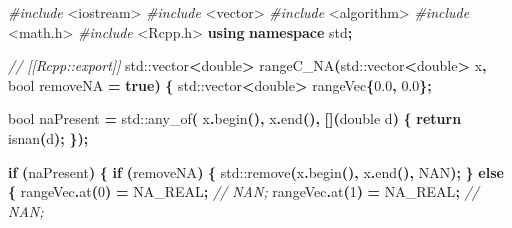 \documentclass[
]{book}
\newenvironment{Shaded}{\begin{snugshade}}{\end{snugshade}}
\newcommand{\BuiltInTok}[1]{#1}
\newcommand{\CommentTok}[1]{\textcolor[rgb]{0.56,0.35,0.01}{\textit{#1}}}
\newcommand{\ControlFlowTok}[1]{\textcolor[rgb]{0.13,0.29,0.53}{\textbf{#1}}}
\newcommand{\DataTypeTok}[1]{\textcolor[rgb]{0.13,0.29,0.53}{#1}}
\newcommand{\DecValTok}[1]{\textcolor[rgb]{0.00,0.00,0.81}{#1}}
\newcommand{\FloatTok}[1]{\textcolor[rgb]{0.00,0.00,0.81}{#1}}
\newcommand{\ImportTok}[1]{#1}
\newcommand{\KeywordTok}[1]{\textcolor[rgb]{0.13,0.29,0.53}{\textbf{#1}}}
\newcommand{\NormalTok}[1]{#1}
\newcommand{\OperatorTok}[1]{\textcolor[rgb]{0.81,0.36,0.00}{\textbf{#1}}}
\newcommand{\PreprocessorTok}[1]{\textcolor[rgb]{0.56,0.35,0.01}{\textit{#1}}}
\begin{document}
\begin{Shaded}
\begin{Highlighting}[]
\PreprocessorTok{\#include }\ImportTok{\textless{}iostream\textgreater{}}
\PreprocessorTok{\#include }\ImportTok{\textless{}vector\textgreater{}}
\PreprocessorTok{\#include }\ImportTok{\textless{}algorithm\textgreater{}}
\PreprocessorTok{\#include }\ImportTok{\textless{}math.h\textgreater{}}
\PreprocessorTok{\#include }\ImportTok{\textless{}Rcpp.h\textgreater{}}
\KeywordTok{using} \KeywordTok{namespace}\NormalTok{ std}\OperatorTok{;}

\CommentTok{// [[Rcpp::export]]}
\BuiltInTok{std::}\NormalTok{vector}\OperatorTok{\textless{}}\DataTypeTok{double}\OperatorTok{\textgreater{}}\NormalTok{ rangeC\_NA}\OperatorTok{(}\BuiltInTok{std::}\NormalTok{vector}\OperatorTok{\textless{}}\DataTypeTok{double}\OperatorTok{\textgreater{}}\NormalTok{ x}\OperatorTok{,} \DataTypeTok{bool}\NormalTok{ removeNA }\OperatorTok{=} \KeywordTok{true}\OperatorTok{)}
\OperatorTok{\{}
    \BuiltInTok{std::}\NormalTok{vector}\OperatorTok{\textless{}}\DataTypeTok{double}\OperatorTok{\textgreater{}}\NormalTok{ rangeVec}\OperatorTok{\{}\FloatTok{0.0}\OperatorTok{,} \FloatTok{0.0}\OperatorTok{\};}

    \DataTypeTok{bool}\NormalTok{ naPresent }\OperatorTok{=} \BuiltInTok{std::}\NormalTok{any\_of}\OperatorTok{(}
\NormalTok{        x}\OperatorTok{.}\NormalTok{begin}\OperatorTok{(),}
\NormalTok{        x}\OperatorTok{.}\NormalTok{end}\OperatorTok{(),}
        \OperatorTok{[](}\DataTypeTok{double}\NormalTok{ d}\OperatorTok{)}
        \OperatorTok{\{} \ControlFlowTok{return}\NormalTok{ isnan}\OperatorTok{(}\NormalTok{d}\OperatorTok{);} \OperatorTok{\});}

    \ControlFlowTok{if} \OperatorTok{(}\NormalTok{naPresent}\OperatorTok{)}
    \OperatorTok{\{}
        \ControlFlowTok{if} \OperatorTok{(}\NormalTok{removeNA}\OperatorTok{)}
        \OperatorTok{\{}
            \BuiltInTok{std::}\NormalTok{remove}\OperatorTok{(}\NormalTok{x}\OperatorTok{.}\NormalTok{begin}\OperatorTok{(),}\NormalTok{ x}\OperatorTok{.}\NormalTok{end}\OperatorTok{(),}\NormalTok{ NAN}\OperatorTok{);}
        \OperatorTok{\}}
        \ControlFlowTok{else}
        \OperatorTok{\{}
\NormalTok{            rangeVec}\OperatorTok{.}\NormalTok{at}\OperatorTok{(}\DecValTok{0}\OperatorTok{)} \OperatorTok{=}\NormalTok{ NA\_REAL}\OperatorTok{;} \CommentTok{// NAN;}
\NormalTok{            rangeVec}\OperatorTok{.}\NormalTok{at}\OperatorTok{(}\DecValTok{1}\OperatorTok{)} \OperatorTok{=}\NormalTok{ NA\_REAL}\OperatorTok{;} \CommentTok{// NAN;}


\end{Highlighting}
\end{Shaded}
\end{document}
